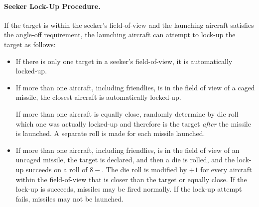 {\paragraph{Seeker Lock-Up Procedure.} If the target is within the seeker’s field-of-view and the launching aircraft satisfies the angle-off requirement, the launching aircraft can attempt to lock-up the target as follows:

\begin{itemize}
    \item If there is only one target in a seeker’s field-of-view, it is automatically locked-up.

    \item If more than one aircraft, including friendlies, is in the field of view of a caged missile, the closest aircraft is automatically locked-up. 
    
    If more than one aircraft is equally close, randomly determine by die roll which one was actually locked-up and therefore is the target \emph{after} the missile is launched. A separate roll is made for each missile launched.

    \item If more than one aircraft, including friendlies, is in the field of view of an uncaged missile, the target is declared, and then a die is rolled, and the lock-up succeeds on a roll of $8-$. The die roll is modified by  $+1$ for every aircraft within the field-of-view that is closer than the target or equally close. If the lock-up is succeeds, missiles may be fired normally. If the lock-up attempt fails, missiles may not be launched.

\end{itemize}

}

